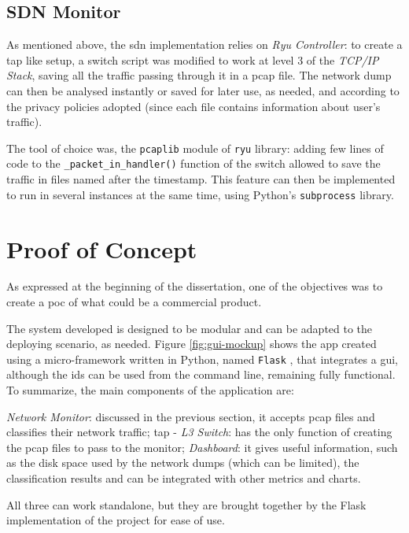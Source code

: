 
\subsection{SDN Monitor}
\label{subsec:sdn-monitor}

As mentioned above, the \gls{sdn} implementation relies on \textit{Ryu Controller}: to create a \gls{tap} like setup, a switch script was modified to work at level 3 of the \textit{TCP/IP Stack}, saving all the traffic passing through it in a \gls{pcap} file. The network dump can then be analysed instantly or saved for later use, as needed, and according to the privacy policies adopted (since each file contains information about user's traffic).
\par The tool of choice was, the \texttt{pcaplib} module of \texttt{ryu} library: adding few lines of code to the \texttt{\_packet\_in\_handler()} function of the switch allowed to save the traffic in files named after the timestamp. This feature can then be implemented to run in several instances at the same time, using Python's \texttt{subprocess} library.


\section{Proof of Concept}
\label{sec:poc}

As expressed at the beginning of the dissertation, one of the objectives was to create a \gls{poc} of what could be a commercial product.
\par The system developed is designed to be modular and can be adapted to the deploying scenario, as needed. Figure \ref{fig:gui-mockup} shows the app created using a micro-framework written in Python, named \texttt{Flask} \cite{FlaskLibrary}, that integrates a \gls{gui}, although the \gls{ids} can be used from the command line, remaining fully functional. To summarize, the main components of the application are:

\begin{itemize}
    \itemAR \textit{Network Monitor}: discussed in the previous section, it accepts \gls{pcap} files and classifies their network traffic;
    \itemAR \gls{tap} - \textit{L3 Switch}: has the only function of creating the \gls{pcap} files to pass to the monitor;
    \itemAR \textit{Dashboard}: it gives useful information, such as the disk space used by the network dumps (which can be limited), the classification results and can be integrated with other metrics and charts.
\end{itemize}
All three can work standalone, but they are brought together by the Flask implementation of the project for ease of use.

